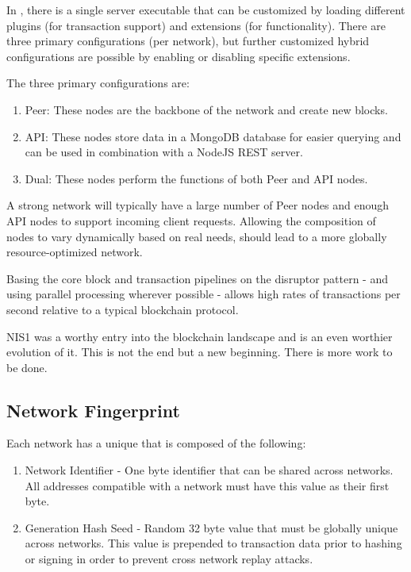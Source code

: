 In \codename, there is a single server executable that can be customized by loading different plugins (for transaction support) and extensions (for functionality).
There are three primary configurations (per network), but further customized hybrid configurations are possible by enabling or disabling specific extensions.

The three primary configurations are:
\begin{enumerate}
	\item{Peer: These nodes are the backbone of the network and create new blocks.}
	\item{API: These nodes store data in a MongoDB database for easier querying and can be used in combination with a NodeJS REST server.}
	\item{Dual: These nodes perform the functions of both Peer and API nodes.}
\end{enumerate}

A strong network will typically have a large number of Peer nodes and enough API nodes to support incoming client requests.
Allowing the composition of nodes to vary dynamically based on real needs, should lead to a more globally resource-optimized network.

Basing the core block and transaction pipelines on the disruptor pattern - and using parallel processing wherever possible - allows high rates of transactions per second relative to a typical blockchain protocol.

NIS1 was a worthy entry into the blockchain landscape and \codenamespace is an even worthier evolution of it.
This is not the end but a new beginning.
There is more work to be done.

\subsection{Network Fingerprint}

Each network has a unique  that is composed of the following:
\begin{enumerate}
	\item{Network Identifier -
		One byte identifier that can be shared across networks.
		All addresses compatible with a network must have this value as their first byte.
	}
	\item{Generation Hash Seed -
		Random 32 byte value that must be globally unique across networks.
		This value is prepended to transaction data prior to hashing or signing in order to prevent cross network replay attacks.
	}
\end{enumerate}
